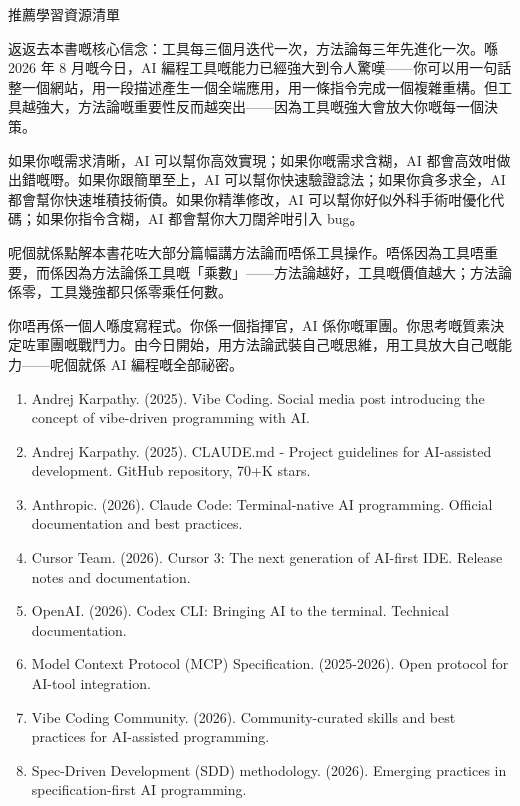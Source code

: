 \begin{center}\small\color{gray}推薦學習資源清單\end{center}


返返去本書嘅核心信念：工具每三個月迭代一次，方法論每三年先進化一次。喺 2026 年 8 月嘅今日，AI 編程工具嘅能力已經強大到令人驚嘆——你可以用一句話整一個網站，用一段描述產生一個全端應用，用一條指令完成一個複雜重構。但工具越強大，方法論嘅重要性反而越突出——因為工具嘅強大會放大你嘅每一個決策。

如果你嘅需求清晰，AI 可以幫你高效實現；如果你嘅需求含糊，AI 都會高效咁做出錯嘅嘢。如果你跟簡單至上，AI 可以幫你快速驗證諗法；如果你貪多求全，AI 都會幫你快速堆積技術債。如果你精準修改，AI 可以幫你好似外科手術咁優化代碼；如果你指令含糊，AI 都會幫你大刀闊斧咁引入 bug。

呢個就係點解本書花咗大部分篇幅講方法論而唔係工具操作。唔係因為工具唔重要，而係因為方法論係工具嘅「乘數」——方法論越好，工具嘅價值越大；方法論係零，工具幾強都只係零乘任何數。

你唔再係一個人喺度寫程式。你係一個指揮官，AI 係你嘅軍團。你思考嘅質素決定咗軍團嘅戰鬥力。由今日開始，用方法論武裝自己嘅思維，用工具放大自己嘅能力——呢個就係 AI 編程嘅全部祕密。


\begin{enumerate}
  \item Andrej Karpathy. (2025). Vibe Coding. Social media post introducing the concept of vibe-driven programming with AI.
  \item Andrej Karpathy. (2025). CLAUDE.md - Project guidelines for AI-assisted development. GitHub repository, 70+K stars.
  \item Anthropic. (2026). Claude Code: Terminal-native AI programming. Official documentation and best practices.
  \item Cursor Team. (2026). Cursor 3: The next generation of AI-first IDE. Release notes and documentation.
  \item OpenAI. (2026). Codex CLI: Bringing AI to the terminal. Technical documentation.
  \item Model Context Protocol (MCP) Specification. (2025-2026). Open protocol for AI-tool integration.
  \item Vibe Coding Community. (2026). Community-curated skills and best practices for AI-assisted programming.
  \item Spec-Driven Development (SDD) methodology. (2026). Emerging practices in specification-first AI programming.
\end{enumerate}
